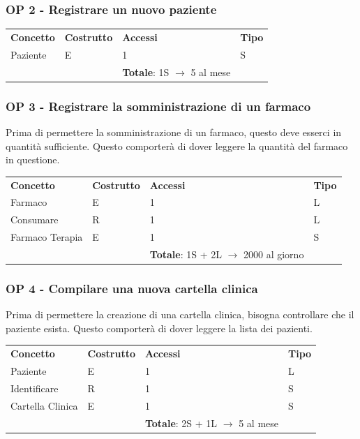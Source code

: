 \documentclass[a4paper, 12pt]{report}
\begin{document}
\subsubsection*{OP 2 - Registrare un nuovo paziente}
\begin{tabularx}{\textwidth}{XlXl}
        \rowcolor{seaGreen}
        \textbf{Concetto} & \textbf{Costrutto} & \textbf{Accessi} & \textbf{Tipo} \\
        Paziente & E & 1 & S \\
        \rowcolor{seaGreen}
         &  & \textbf{Totale}: 1S $\rightarrow$ 5 al mese & \\
\end{tabularx}

\subsubsection*{OP 3 - Registrare la somministrazione di un farmaco}
Prima di permettere la somministrazione di un farmaco, questo deve esserci in quantità sufficiente.
Questo comporterà di dover leggere la quantità del farmaco in questione. \\
\begin{tabularx}{\textwidth}{XlXl}
        \rowcolor{seaGreen}
        \textbf{Concetto} & \textbf{Costrutto} & \textbf{Accessi} & \textbf{Tipo} \\
        Farmaco & E & 1 & L \\
        \hline
        Consumare & R & 1 & L \\
        \hline
        Farmaco Terapia & E & 1 & S \\
        \rowcolor{seaGreen}
         &  & \textbf{Totale}: 1S + 2L $\rightarrow$ 2000 al giorno & \\
\end{tabularx}

\subsubsection*{OP 4 - Compilare una nuova cartella clinica}
Prima di permettere la creazione di una cartella clinica, bisogna controllare che il paziente esista.
Questo comporterà di dover leggere la lista dei pazienti. \par
\bigskip
\noindent
\begin{tabularx}{\textwidth}{XlXl}
        \rowcolor{seaGreen}
        \textbf{Concetto} & \textbf{Costrutto} & \textbf{Accessi} & \textbf{Tipo} \\
        Paziente & E & 1 & L \\
        \hline
        Identificare & R & 1 & S \\
        \hline
        Cartella Clinica & E & 1 & S \\
        \rowcolor{seaGreen}
         &  & \textbf{Totale}: 2S + 1L $\rightarrow$ 5 al mese & \\
\end{tabularx}
\end{document}
